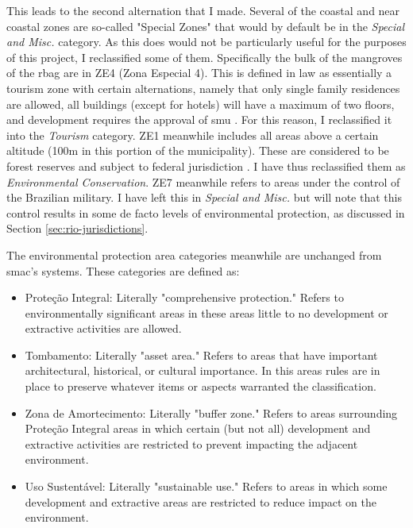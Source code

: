 This leads to the second alternation that I made. Several of the coastal and near coastal zones are so-called "Special Zones" that would by default be in the \textit{Special and Misc.} category. As this does would not be particularly useful for the purposes of this project, I reclassified some of them. Specifically the bulk of the mangroves of the \ac{rbag} are in ZE4 (Zona Especial 4). This is defined in law as essentially a tourism zone with certain alternations, namely that only single family residences are allowed, all buildings (except for hotels) will have a maximum of two floors, and development requires the approval of \ac{smu} \cite{prefeitodacidadedoriodejaneiroDecretoNo3221976}. For this reason, I reclassified it into the \textit{Tourism} category. ZE1 meanwhile includes all areas above a certain altitude (100m in this portion of the municipality). These are considered to be forest reserves and subject to federal jurisdiction \cite{prefeitodacidadedoriodejaneiroDecretoNo3221976}. I have thus reclassified them as \textit{Environmental Conservation}. ZE7 meanwhile refers to areas under the control of the Brazilian military. I have left this in \textit{Special and Misc.} but will note that this control results in some de facto levels of environmental protection, as discussed in Section \ref{sec:rio-jurisdictions}.

The environmental protection area categories meanwhile are unchanged from \ac{smac}'s systems. These categories are defined as:

\begin{itemize}[itemsep=0pt,parsep=0pt]
	\item{Proteção Integral: Literally "comprehensive protection." Refers to environmentally significant areas in these areas little to no development or extractive activities are allowed.}
	\item{Tombamento: Literally "asset area." Refers to areas that have important architectural, historical, or cultural importance. In this areas rules are in place to preserve whatever items or aspects warranted the classification.}
	\item{Zona de Amortecimento: Literally "buffer zone." Refers to areas surrounding Proteção Integral areas in which certain (but not all) development and extractive activities are restricted to prevent impacting the adjacent environment.}
	\item{Uso Sustentável: Literally "sustainable use." Refers to areas in which some development and extractive areas are restricted to reduce impact on the environment.}
\end{itemize}

